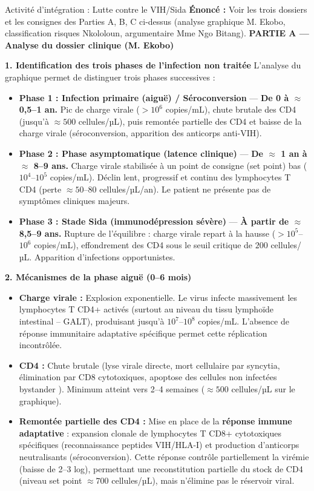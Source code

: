 \documentclass[11pt]{article}
\begin{document}
\begin{exoresolu}{Activité d'intégration : Lutte contre le VIH/Sida}
\textbf{Énoncé :} Voir les trois dossiers et les consignes des Parties A, B, C ci-dessus (analyse graphique M. Ekobo, classification risques Nkololoun, argumentaire Mme Ngo Bitang).
\tcblower
\textbf{PARTIE A — Analyse du dossier clinique (M. Ekobo)}

\textbf{1. Identification des trois phases de l'infection non traitée}
L'analyse du graphique permet de distinguer trois phases successives :
\begin{itemize}
    \item \textbf{Phase 1 : Infection primaire (aiguë) / Séroconversion} — \textbf{De 0 à $\approx$ 0,5--1 an.} Pic de charge virale ($> 10^6$ copies/mL), chute brutale des CD4 (jusqu'à $\approx 500$ cellules/µL), puis remontée partielle des CD4 et baisse de la charge virale (séroconversion, apparition des anticorps anti-VIH).
    \item \textbf{Phase 2 : Phase asymptomatique (latence clinique)} — \textbf{De $\approx$ 1 an à $\approx$ 8--9 ans.} Charge virale stabilisée à un \og point de consigne \fg (set point) bas ($10^4$--$10^5$ copies/mL). Déclin lent, progressif et continu des lymphocytes T CD4 (perte $\approx 50$--$80$ cellules/µL/an). Le patient ne présente pas de symptômes cliniques majeurs.
    \item \textbf{Phase 3 : Stade Sida (immunodépression sévère)} — \textbf{À partir de $\approx$ 8,5--9 ans.} Rupture de l'équilibre : charge virale repart à la hausse ($> 10^5$--$10^6$ copies/mL), effondrement des CD4 sous le seuil critique de $200$ cellules/µL. Apparition d'infections opportunistes.
\end{itemize}

\textbf{2. Mécanismes de la phase aiguë (0--6 mois)}
\begin{itemize}
    \item \textbf{Charge virale :} Explosion exponentielle. Le virus infecte massivement les lymphocytes T CD4+ activés (surtout au niveau du tissu lymphoïde intestinal -- GALT), produisant jusqu'à $10^7$--$10^8$ copies/mL. L'absence de réponse immunitaire adaptative spécifique permet cette réplication incontrôlée.
    \item \textbf{CD4 :} Chute brutale (lyse virale directe, mort cellulaire par syncytia, élimination par CD8 cytotoxiques, apoptose des cellules non infectées \og bystander \fg). Minimum atteint vers 2--4 semaines ($\approx 500$ cellules/µL sur le graphique).
    \item \textbf{Remontée partielle des CD4 :} Mise en place de la \textbf{réponse immune adaptative} : expansion clonale de lymphocytes T CD8+ cytotoxiques spécifiques (reconnaissance peptides VIH/HLA-I) et production d'anticorps neutralisants (séroconversion). Cette réponse contrôle partiellement la virémie (baisse de 2--3 log), permettant une reconstitution partielle du stock de CD4 (niveau \og set point \fg $\approx 700$ cellules/µL), mais n'élimine pas le réservoir viral.
\end{itemize}


\end{exoresolu}
\end{document}
